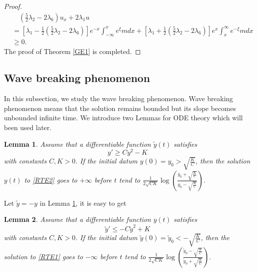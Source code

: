 \documentclass[11pt]{article}
\newtheorem{lemma}{Lemma}
\begin{document}
\begin{proof}
\begin{equation*}
\begin{aligned}
&\quad\left(\frac{5}{2}\lambda_2-2\lambda_6\right)u_x+2\lambda_1u\\
&=\left[\lambda_1-\frac{1}{2}\left(\frac{5}{2}\lambda_2-2\lambda_6\right)\right]
e^{-x}\int_{-\infty}^x e^\xi mdx
+\left[\lambda_1+\frac{1}{2}\left(\frac{5}{2}\lambda_2-2\lambda_6\right)\right]
e^{x}\int_{x}^{\infty}  e^{-\xi} mdx\\
&\geq0.
\end{aligned}
\end{equation*}
The proof of Theorem \ref{GE1} is completed.
\end{proof}

\subsection{Wave breaking phenomenon}
In this subsection, we study the wave breaking phenomenon. Wave breaking phenomenon means that the solution remains bounded but its slope becomes unbounded inﬁnite time. We introduce two Lemmas for ODE theory which will been used later.
\begin{lemma}\emph{\cite{Chen2016JFA}}\label{ybl1}
Assume that a differentiable function $\tilde{y}(t)$ satisfies
\begin{equation}\label{RTE2}
y'\geq Cy^2-K
\end{equation}
with constants $C, K > 0$. If the initial datum $y(0) = y_0 >\sqrt{\frac{K}{C}}$, then the solution $y(t)$ to \eqref{RTE2} goes to $+\infty$ before $t$ tend to 
$\frac{1}{2\sqrt{CK}}\log\left(\frac{y_0+\sqrt{\frac{K}{C}}}{y_0-\sqrt{\frac{K}{C}}}\right)$.
\end{lemma}
Let $\tilde{y}=-y$ in Lemma \ref{ybl1}, it is easy to get
\begin{lemma}\label{ybl2}
Assume that a differentiable function $y(t)$ satisfies
\begin{equation}\label{RTE1}
\tilde{y}'\leq-C\tilde{y}^2+K
\end{equation}
with constants $C, K > 0$. If the initial datum $\tilde{y}(0) = \tilde{y}_0 < -\sqrt{\frac{K}{C}}$, then the solution to \eqref{RTE1} goes to $-\infty$ before $t$ tend to 
$\frac{1}{2\sqrt{CK}}\log\left(\frac{\tilde{y}_0-\sqrt{\frac{K}{C}}}{\tilde{y}_0+\sqrt{\frac{K}{C}}}\right)$.
\end{lemma}
\end{document}
